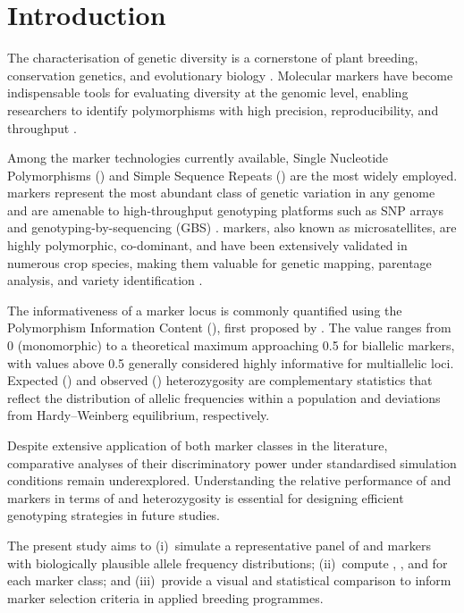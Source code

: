 
\section{Introduction}
\label{sec:intro}

The characterisation of genetic diversity is a cornerstone of plant
breeding, conservation genetics, and evolutionary biology
\autocite{Hamrick1989}. Molecular markers have become indispensable
tools for evaluating diversity at the genomic level, enabling
researchers to identify polymorphisms with high precision, reproducibility,
and throughput \autocite{Semagn2006}.

Among the marker technologies currently available, Single Nucleotide
Polymorphisms (\snp{}) and Simple Sequence Repeats (\ssr{}) are the
most widely employed. \snp{} markers represent the most abundant class
of genetic variation in any genome and are amenable to high-throughput
genotyping platforms such as SNP arrays and genotyping-by-sequencing
(GBS) \autocite{Elshire2011}. \ssr{} markers, also known as
microsatellites, are highly polymorphic, co-dominant, and have been
extensively validated in numerous crop species, making them valuable
for genetic mapping, parentage analysis, and variety identification
\autocite{Powell1996}.

The informativeness of a marker locus is commonly quantified using the
Polymorphism Information Content (\pic{}), first proposed by
\textcite{Botstein1980}. The \pic{} value ranges from 0 (monomorphic)
to a theoretical maximum approaching 0.5 for biallelic markers, with
values above 0.5 generally considered highly informative for multiallelic
loci. Expected (\he{}) and observed (\ho{}) heterozygosity are
complementary statistics that reflect the distribution of allelic
frequencies within a population and deviations from Hardy--Weinberg
equilibrium, respectively.

Despite extensive application of both marker classes in the literature,
comparative analyses of their discriminatory power under standardised
simulation conditions remain underexplored. Understanding the relative
performance of \snp{} and \ssr{} markers in terms of \pic{} and
heterozygosity is essential for designing efficient genotyping strategies
in future studies.

The present study aims to (i)~simulate a representative panel of
\snp{} and \ssr{} markers with biologically plausible allele frequency
distributions; (ii)~compute \pic{}, \he{}, and \ho{} for each marker
class; and (iii)~provide a visual and statistical comparison to inform
marker selection criteria in applied breeding programmes.
